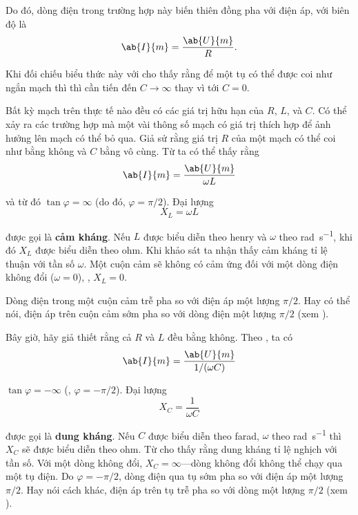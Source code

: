 \noindent
Do đó, dòng điện trong trường hợp này biến thiên đồng pha với điện áp, với biên độ là
\begin{equation*}
    \ab{I}{m} = \frac{\ab{U}{m}}{R}.
\end{equation*}

\noindent
Khi đối chiếu biểu thức này với  cho thấy rằng để một tụ có thể được coi như ngắn mạch thì thì cần tiến đến $C\to\infty$ thay vì tới $C = 0$.

Bất kỳ mạch trên thực tế nào đều có các giá trị hữu hạn của $R$, $L$, và $C$.
Có thể xảy ra các trường hợp mà một vài thông số mạch có giá trị thích hợp để ảnh hưởng lên mạch có thể bỏ qua.
Giả sử rằng giá trị $R$ của một mạch có thể coi như bằng không và $C$ bằng vô cùng.
Từ  ta có thể thấy rằng
\begin{equation}\label{eq:13_50}
    \ab{I}{m} = \frac{\ab{U}{m}}{\omega L}
\end{equation}

\noindent
và từ đó $\tan\varphi=\infty$ (do đó, $\varphi=\pi/2$).
Đại lượng
\begin{equation}\label{eq:13_51}
    X_L = \omega L
\end{equation}

\noindent
được gọi là \textbf{cảm kháng}.
Nếu $L$ được biểu diễn theo henry và $\omega$ theo \si{\radian\per\second}, khi đó $X_L$ được biểu diễn theo ohm.
Khi khảo sát  ta nhận thấy cảm kháng tỉ lệ thuận với tần số $\omega$.
Một cuộn cảm sẽ không có cảm ứng đối với một dòng điện không đổi ($\omega=0$), \ie, $X_L=0$.

Dòng điện trong một cuộn cảm trễ pha so với điện áp một lượng $\pi/2$.
Hay có thể nói, điện áp trên cuộn cảm sớm pha so với dòng điện một lượng $\pi/2$ (xem ).

Bây giờ, hãy giả thiết rằng cả $R$ và $L$ đều bằng không.
Theo , ta có
\begin{equation}\label{eq:13_52}
    \ab{I}{m} = \frac{\ab{U}{m}}{1/(\omega C)}
\end{equation}

\noindent
$\tan\varphi=-\infty$ (\ie, $\varphi=-\pi/2$).
Đại lượng
\begin{equation}\label{eq:13_53}
    X_C = \frac{1}{\omega C}
\end{equation}

\noindent
được gọi là \textbf{dung kháng}.
Nếu $C$ được biểu diễn theo farad, $\omega$ theo \si{\radian\per\second} thì $X_C$ sẽ được biểu diễn theo ohm.
Từ  cho thấy rằng dung kháng tỉ lệ nghịch với tần số.
Với một dòng không đổi, $X_C=\infty$---dòng không đổi không thể chạy qua một tụ điện.
Do $\varphi=-\pi/2$, dòng điện qua tụ sớm pha so với điện áp một lượng $\pi/2$.
Hay nói cách khác, điện áp trên tụ trễ pha so với dòng một lượng $\pi/2$ (xem ).

